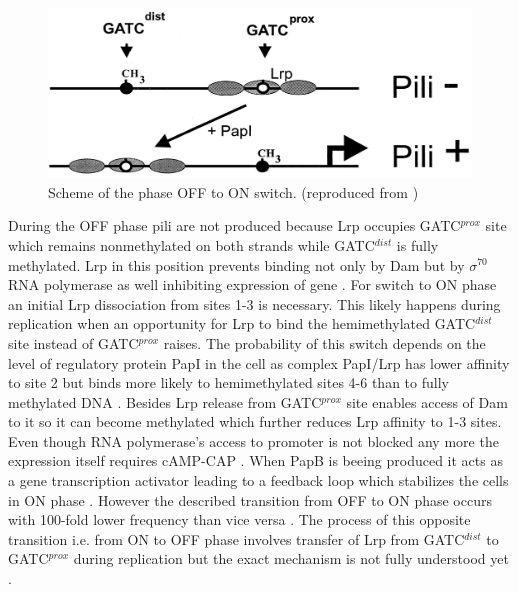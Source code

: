 \begin{figure}[h!]
  \centering
  \includegraphics[scale=0.3]{text/Pictures/papPili.png}
	\caption{Scheme of the  phase OFF to ON switch. (reproduced from \cite{low2001roles})}
	\label{pap}
\end{figure}
During the OFF phase  pili are not produced because Lrp occupies GATC$^{prox}$ site which remains nonmethylated on both strands while GATC$^{dist}$ is fully methylated.
Lrp in this position prevents binding not only by Dam but by $\sigma^{70}$ RNA polymerase as well inhibiting expression of  gene \cite{weyand2000regulation}.
For switch to ON phase an initial Lrp dissociation from sites 1-3 is necessary.
This likely happens during replication when an opportunity for Lrp to bind the hemimethylated GATC$^{dist}$ site instead of GATC$^{prox}$ raises.
The probability of this switch depends on the level of regulatory protein PapI in the cell as complex PapI/Lrp has lower affinity to site 2 but binds more likely to hemimethylated sites 4-6 than to fully methylated DNA \cite{hernday2003mechanism}.
Besides Lrp release from GATC$^{prox}$ site enables access of Dam to it so it can become methylated which further reduces Lrp affinity to 1-3 sites.
Even though RNA polymerase's access to  promoter is not blocked any more the expression itself requires cAMP-CAP \cite{weyand2001essential}.
When PapB is beeing produced it acts as a  gene transcription activator leading to a feedback loop which stabilizes the cells in ON phase \cite{forsman1989autoregulation}.
However the described transition from OFF to ON phase occurs with 100-fold lower frequency than vice versa \cite{blyn1990regulation}.
The process of this opposite transition i.e. from ON to OFF phase involves transfer of Lrp from GATC$^{dist}$ to GATC$^{prox}$ during replication but the exact mechanism is not fully understood yet \cite{adhikari2016dna}.

